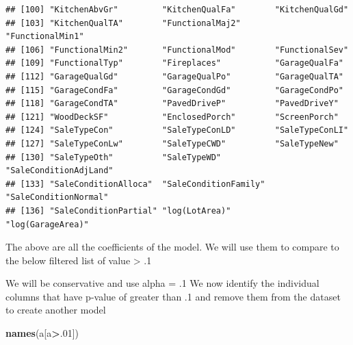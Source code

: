 \documentclass[
]{article}
\newenvironment{Shaded}{\begin{snugshade}}{\end{snugshade}}
\newcommand{\DecValTok}[1]{\textcolor[rgb]{0.00,0.00,0.81}{#1}}
\newcommand{\KeywordTok}[1]{\textcolor[rgb]{0.13,0.29,0.53}{\textbf{#1}}}
\newcommand{\NormalTok}[1]{#1}
\newcommand{\OperatorTok}[1]{\textcolor[rgb]{0.81,0.36,0.00}{\textbf{#1}}}
\begin{document}
\begin{verbatim}
## [100] "KitchenAbvGr"         "KitchenQualFa"        "KitchenQualGd"       
## [103] "KitchenQualTA"        "FunctionalMaj2"       "FunctionalMin1"      
## [106] "FunctionalMin2"       "FunctionalMod"        "FunctionalSev"       
## [109] "FunctionalTyp"        "Fireplaces"           "GarageQualFa"        
## [112] "GarageQualGd"         "GarageQualPo"         "GarageQualTA"        
## [115] "GarageCondFa"         "GarageCondGd"         "GarageCondPo"        
## [118] "GarageCondTA"         "PavedDriveP"          "PavedDriveY"         
## [121] "WoodDeckSF"           "EnclosedPorch"        "ScreenPorch"         
## [124] "SaleTypeCon"          "SaleTypeConLD"        "SaleTypeConLI"       
## [127] "SaleTypeConLw"        "SaleTypeCWD"          "SaleTypeNew"         
## [130] "SaleTypeOth"          "SaleTypeWD"           "SaleConditionAdjLand"
## [133] "SaleConditionAlloca"  "SaleConditionFamily"  "SaleConditionNormal" 
## [136] "SaleConditionPartial" "log(LotArea)"         "log(GarageArea)"
\end{verbatim}

The above are all the coefficients of the model. We will use them to compare to the below filtered list of value \textgreater{} .1

We will be conservative and use alpha = .1 We now identify the individual columns that have p-value of greater than .1 and remove them from the dataset to create another model

\begin{Shaded}
\begin{Highlighting}[]
\KeywordTok{names}\NormalTok{(a[a}\OperatorTok{>}\NormalTok{.}\DecValTok{01}\NormalTok{])}
\end{Highlighting}
\end{Shaded}
\end{document}
